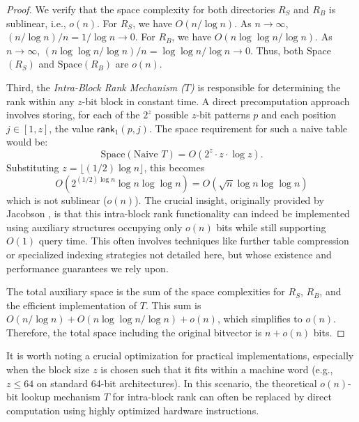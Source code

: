 \begin{proof}
    We verify that the space complexity for both directories $R_S$ and $R_B$ is sublinear, i.e., $o(n)$. For $R_S$, we have $O(n / \log n)$. As $n \to \infty$, $(n / \log n) / n = 1 / \log n \to 0$. For $R_B$, we have $O(n \log \log n / \log n)$. As $n \to \infty$, $(n \log \log n / \log n) / n = \log \log n / \log n \to 0$. Thus, both Space$(R_S)$ and Space$(R_B)$ are $o(n)$.

    Third, the \emph{Intra-Block Rank Mechanism ($T$)} is responsible for determining the rank within any $z$-bit block in constant time. A direct precomputation approach involves storing, for each of the $2^z$ possible $z$-bit patterns $p$ and each position $j \in [1, z]$, the value $\textsf{rank}_1(p, j)$. The space requirement for such a naive table would be:
    \begin{equation*}
        \text{Space}(\text{Naive } T) = O(2^z \cdot z \cdot \log z).
    \end{equation*}
    Substituting $z = \lfloor (1/2) \log n \rfloor$, this becomes
    \begin{equation*}
        O(2^{(1/2)\log n} \log n \log \log n) = O(\sqrt{n} \log n \log \log n)
    \end{equation*}
    which is not sublinear ($o(n)$). The crucial insight, originally provided by Jacobson \cite{Jacobson}, is that this intra-block rank functionality can indeed be implemented using auxiliary structures occupying only $o(n)$ bits while still supporting $O(1)$ query time. This often involves techniques like further table compression or specialized indexing strategies not detailed here, but whose existence and performance guarantees we rely upon.

    The total auxiliary space is the sum of the space complexities for $R_S$, $R_B$, and the efficient implementation of $T$. This sum is $O(n / \log n) + O(n \log \log n / \log n) + o(n)$, which simplifies to $o(n)$. Therefore, the total space including the original bitvector is $n + o(n)$ bits.
\end{proof}

It is worth noting a crucial optimization for practical implementations, especially when the block size $z$ is chosen such that it fits within a machine word (e.g., $z \le 64$ on standard 64-bit architectures). In this scenario, the theoretical $o(n)$-bit lookup mechanism $T$ for intra-block rank can often be replaced by direct computation using highly optimized hardware instructions.

